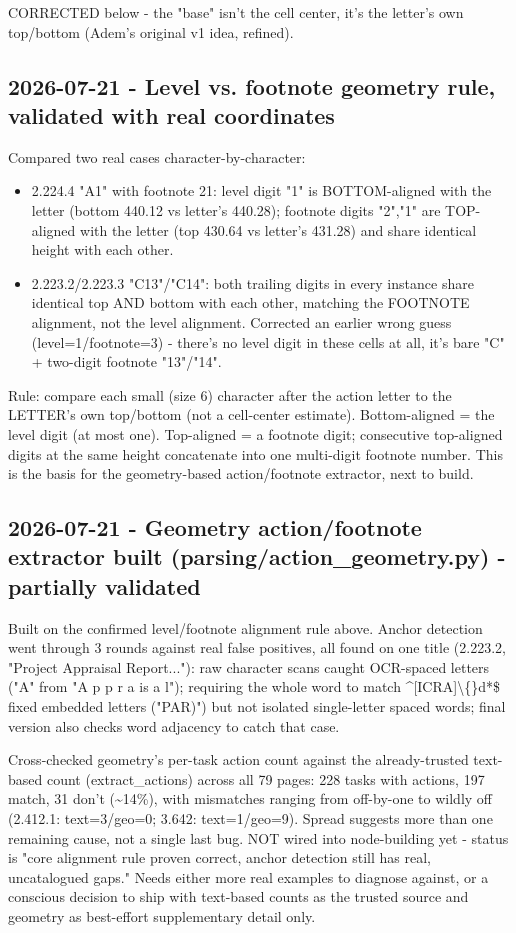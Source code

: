 CORRECTED below - the "base" isn't the cell center, it's the letter's own top/bottom (Adem's original v1 idea, refined).

\subsection*{2026-07-21 - Level vs. footnote geometry rule, validated with real coordinates}
Compared two real cases character-by-character:

\begin{itemize}
\item 2.224.4 "A1" with footnote 21: level digit "1" is BOTTOM-aligned with the letter (bottom 440.12 vs letter's 440.28); footnote digits "2","1" are TOP-aligned with the letter (top 430.64 vs letter's 431.28) and share identical height with each other.
\item 2.223.2/2.223.3 "C13"/"C14": both trailing digits in every instance share identical top AND bottom with each other, matching the FOOTNOTE alignment, not the level alignment. Corrected an earlier wrong guess (level=1/footnote=3) - there's no level digit in these cells at all, it's bare "C" + two-digit footnote "13"/"14".
\end{itemize}
Rule: compare each small (size 6) character after the action letter to the LETTER's own top/bottom (not a cell-center estimate). Bottom-aligned = the level digit (at most one). Top-aligned = a footnote digit; consecutive top-aligned digits at the same height concatenate into one multi-digit footnote number. This is the basis for the geometry-based action/footnote extractor, next to build.

\subsection*{2026-07-21 - Geometry action/footnote extractor built (parsing/action\_geometry.py) - partially validated}
Built on the confirmed level/footnote alignment rule above. Anchor detection went through 3 rounds against real false positives, all found on one title (2.223.2, "Project Appraisal Report..."): raw character scans caught OCR-spaced letters ("A" from "A p p r a is a l"); requiring the whole word to match \textasciicircum{}[ICRA]\textbackslash\{\}d*\$ fixed embedded letters ("PAR)") but not isolated single-letter spaced words; final version also checks word adjacency to catch that case.

Cross-checked geometry's per-task action count against the already-trusted text-based count (extract\_actions) across all 79 pages: 228 tasks with actions, 197 match, 31 don't (\textasciitilde{}14\%), with mismatches ranging from off-by-one to wildly off (2.412.1: text=3/geo=0; 3.642: text=1/geo=9). Spread suggests more than one remaining cause, not a single last bug. NOT wired into node-building yet - status is "core alignment rule proven correct, anchor detection still has real, uncatalogued gaps." Needs either more real examples to diagnose against, or a conscious decision to ship with text-based counts as the trusted source and geometry as best-effort supplementary detail only.

